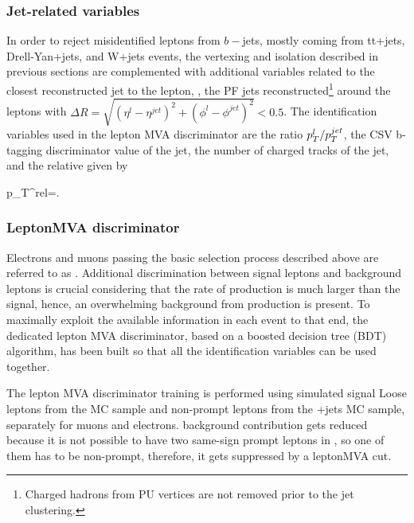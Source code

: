 \subsubsection*{Jet-related variables}

In order to reject misidentified leptons from $b-$jets, mostly coming from tt+jets, Drell-Yan+jets, and W+jets events, the vertexing and isolation described in previous sections are complemented with additional variables related to the closest reconstructed jet to the lepton, \ie, the PF jets reconstructed\footnote{Charged hadrons from PU vertices are not removed prior to the jet clustering.} around the leptons with $\Delta R=\sqrt{( \eta^l - \eta^{jet})^2 + (\phi^l - \phi^{jet})^2} < 0.5$. The identification variables used in the lepton MVA discriminator are the ratio $p_T^l/p_T^{jet}$, the CSV b-tagging discriminator value of the jet, the number of charged tracks of the jet, and the relative \pt given by

\beqn
p_T^{rel}=.
\eeqn


\subsubsection*{LeptonMVA discriminator}\label{sssec:leptonmva}

Electrons and muons passing the basic selection process described above are referred to as . Additional discrimination between signal leptons and background leptons is crucial considering that the rate of \ttbar production is much larger than the signal, hence, an overwhelming background from \ttbar production is present. To maximally exploit the available information in each event to that end, the dedicated lepton MVA discriminator, based on a boosted decision tree (BDT) algorithm, has been built so that all the identification variables can be used together.

The lepton MVA discriminator training is performed using simulated signal Loose leptons from the \ttH MC sample and non-prompt leptons from the \ttbar+jets MC sample, separately for muons and electrons. \ttbar background contribution gets reduced because it is not possible to have two same-sign prompt leptons in \ttbar, so one of them has to be non-prompt, therefore, it gets suppressed by a leptonMVA cut.

